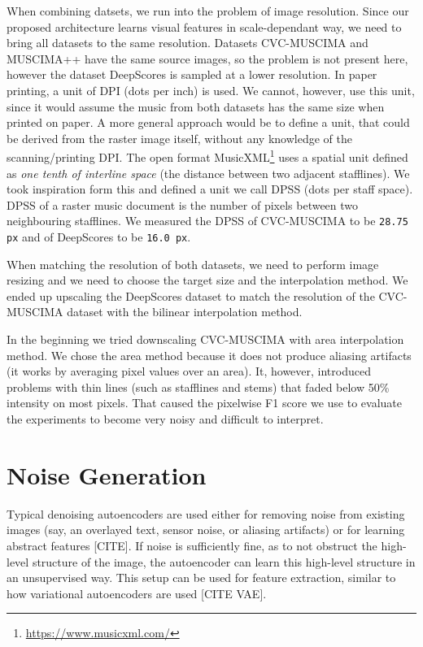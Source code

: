 
When combining datsets, we run into the problem of image resolution. Since our proposed architecture learns visual features in scale-dependant way, we need to bring all datasets to the same resolution. Datasets CVC-MUSCIMA and MUSCIMA++ have the same source images, so the problem is not present here, however the dataset DeepScores is sampled at a lower resolution. In paper printing, a unit of DPI (dots per inch) is used. We cannot, however, use this unit, since it would assume the music from both datasets has the same size when printed on paper. A more general approach would be to define a unit, that could be derived from the raster image itself, without any knowledge of the scanning/printing DPI. The open format MusicXML\footnote{\url{https://www.musicxml.com/}} uses a spatial unit defined as \emph{one tenth of interline space} (the distance between two adjacent stafflines). We took inspiration form this and defined a unit we call DPSS (dots per staff space). DPSS of a raster music document is the number of pixels between two neighbouring stafflines. We measured the DPSS of CVC-MUSCIMA to be \verb`28.75 px` and of DeepScores to be \verb`16.0 px`.


When matching the resolution of both datasets, we need to perform image resizing and we need to choose the target size and the interpolation method. We ended up upscaling the DeepScores dataset to match the resolution of the CVC-MUSCIMA dataset with the bilinear interpolation method.

In the beginning we tried downscaling CVC-MUSCIMA with area interpolation method. We chose the area method because it does not produce aliasing artifacts (it works by averaging pixel values over an area). It, however, introduced problems with thin lines (such as stafflines and stems) that faded below 50\% intensity on most pixels. That caused the pixelwise F1 score we use to evaluate the experiments to become very noisy and difficult to interpret.


\section{Noise Generation}
\label{sec:NoiseGeneration}

Typical denoising autoencoders are used either for removing noise from existing images (say, an overlayed text, sensor noise, or aliasing artifacts) or for learning abstract features [CITE]. If noise is sufficiently fine, as to not obstruct the high-level structure of the image, the autoencoder can learn this high-level structure in an unsupervised way. This setup can be used for feature extraction, similar to how variational autoencoders are used [CITE VAE].

